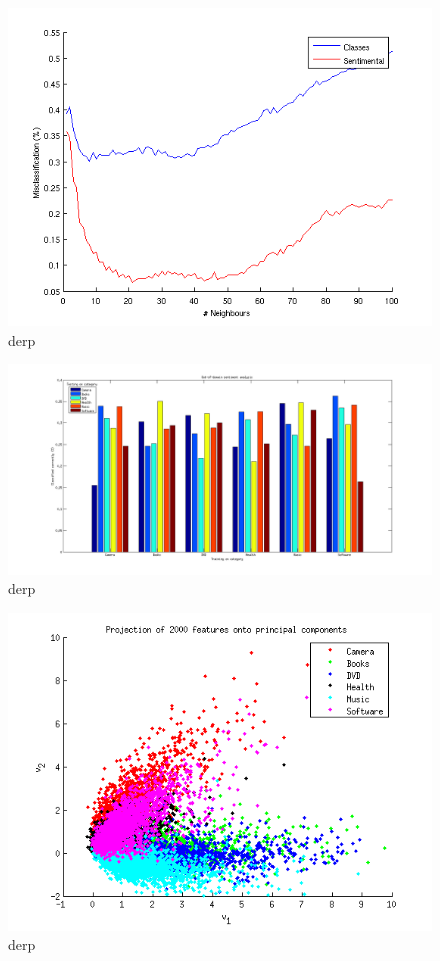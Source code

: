 \begin{figure}[H]
\centering
\includegraphics[scale = 0.5]{../Plottar/knn_2000words_testdata100_unigram.png}
\caption{derp}
\label{fig:trainingsize}
\end{figure} 


\begin{figure}[H]
\centering
\includegraphics[scale = 0.5]{../Plottar/outofdomain.png}
\caption{derp}
\label{fig:trainingsize}
\end{figure} 

\begin{figure}[H]
\centering
\includegraphics[scale = 0.5]{../Plottar/pca_all.png}
\caption{derp}
\label{fig:trainingsize}
\end{figure} 

